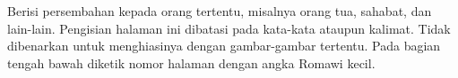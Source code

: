\vspace*{1cm}
Berisi persembahan kepada orang tertentu, misalnya orang tua, sahabat, dan lain-lain. Pengisian halaman ini dibatasi pada kata-kata ataupun kalimat. Tidak dibenarkan untuk menghiasinya dengan gambar-gambar tertentu. Pada bagian tengah bawah diketik nomor halaman dengan angka Romawi kecil.